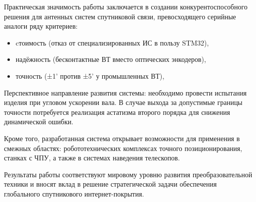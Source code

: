 Практическая значимость работы заключается в создании конкурентоспособного решения для антенных систем спутниковой связи, 
превосходящего серийные аналоги ряду критериев:
\begin{itemize}
    \item cтоимость (отказ от специализированных ИС в пользу STM32),
    \item надёжность (бесконтактные ВТ вместо оптических энкодеров),
    \item точность (±1' против ±5' у промышленных ВТ),
\end{itemize}

Перспективное направление развития системы: необходимо провести испытания изделия при угловом ускорении вала. 
В случае выхода за допустимые границы точности потребуется реализация астатизма второго порядка для снижения динамической ошибки.


Кроме того, разработанная система открывает возможности для применения в смежных областях: робототехнических комплексах точного позиционирования, 
станках с ЧПУ, а также в системах наведения телескопов.


Результаты работы соответствуют мировому уровню развития преобразовательной техники и вносят вклад в решение стратегической задачи обеспечения 
глобального спутникового интернет-покрытия.
